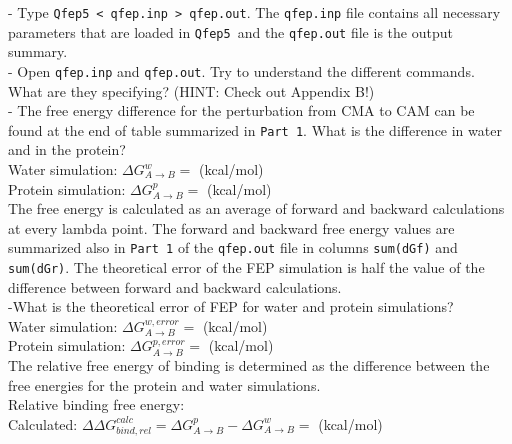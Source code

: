 \documentclass[a4paper,12pt]{article}
\newcommand{\qfep}{\texttt{Qfep5}}
\begin{document}
- Type \qfep\ \texttt{< qfep.inp > qfep.out}. The
\texttt{qfep.inp} file contains all necessary parameters that are
loaded in \qfep\ and the \texttt{qfep.out} file is the output summary.\\

- Open \texttt{qfep.inp} and \texttt{qfep.out}. Try to understand the different commands.
What are they specifying? (HINT: Check out Appendix B!)\\

- The free energy difference for the perturbation from CMA to CAM
can be found at the end of table summarized in \texttt{Part 1}.
What is the difference in water and in the protein?\\

Water simulation: $\Delta G_{A \rightarrow B}^w=$ \hspace{2cm} (kcal/mol)\\

Protein simulation: $\Delta G_{A \rightarrow B}^p=$ \hspace{2cm}(kcal/mol)\\

The free energy is calculated as an average of forward and backward calculations
at every lambda point. The forward and backward free energy values are summarized
also in \texttt{Part 1} of the \texttt{qfep.out} file in columns \texttt{sum(dGf)}
and \texttt{sum(dGr)}. The theoretical error of the FEP simulation is half the value of
the difference between forward and backward calculations.\\

-What is the theoretical error of FEP for water and protein simulations?\\

Water simulation: $\Delta G_{A \rightarrow B}^{w,error}=$ \hspace{2cm} (kcal/mol)\\

Protein simulation: $\Delta G_{A \rightarrow B}^{p,error}=$ \hspace{2cm}(kcal/mol)\\

The relative free energy of binding is determined as the difference between the
free energies for the protein and water simulations.\\

Relative binding free energy:\\

Calculated: $\Delta \Delta G_{bind,rel}^{calc} = \Delta G_{A \rightarrow B}^p-\Delta G_{A \rightarrow B}^w=$\hspace{1cm} (kcal/mol)\\
\end{document}
